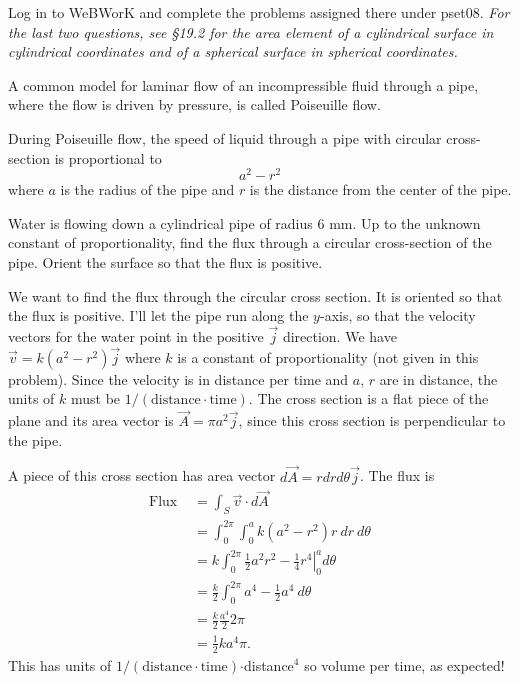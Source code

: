 \documentclass[12pt,letterpaper,noanswers]{exam}
\begin{document}
 \pdfpageheight 11in 
  \pdfpagewidth 8.5in

\begin{questions}
\question Log in to WeBWorK and complete the problems assigned there under pset08.  \emph{For the last two questions, see \S 19.2 for the area element of a cylindrical surface in cylindrical coordinates and of a spherical surface in spherical coordinates.}


\question A common model for laminar flow of an incompressible fluid through a pipe, where the flow is driven by pressure, is called Poiseuille flow.  



During Poiseuille flow, the speed of liquid through a pipe with circular cross-section is proportional to \[a^2-r^2\] where $a$ is the radius of the pipe and $r$ is the distance from the center of the pipe.  

\begin{parts}
\item Water is flowing down a cylindrical pipe of radius $6$ mm. Up to the unknown constant of proportionality, find the flux through a circular cross-section of the pipe.  Orient the surface so that the flux is positive.



\begin{solution}
We want to find the flux through the circular cross section.  It is oriented so that the flux is positive.  I'll let the pipe run along the $y$-axis, so that the velocity vectors for the water point in the positive $\vec j$ direction.  We have $\vec v = k(a^2-r^2)\vec j$ where $k$ is a constant of proportionality (not given in this problem).  Since the velocity is in distance per time and $a$, $r$ are in distance, the units of $k$ must be $1/(\text{distance}\cdot\text{time})$.  The cross section is a flat piece of the plane and its area vector is $\vec A = \pi a^2 \vec j$, since this cross section is perpendicular to the pipe.

A piece of this cross section has area vector $d\vec A = r drd\theta \vec j$.  The flux is
\begin{align*}
\text{Flux } &= \int_S \vec v \cdot d\vec A \\
&= \int_0^{2\pi}\int_0^a k(a^2-r^2) r\ dr\ d\theta \\
&= k\int_0^{2\pi} \left. \frac{1}{2}a^2r^2 - \frac{1}{4}r^4 \right\vert_0^a d\theta \\
&= \frac{k}{2} \int_0^{2\pi} a^4 - \frac{1}{2}a^4\ d\theta \\
&= \frac{k}{2}\frac{a^4}{2}2\pi \\
&= \frac{1}{2}ka^4\pi.
\end{align*}
This has units of  $1/(\text{distance}\cdot\text{time})$$\cdot$distance$^4$ so volume per time, as expected!


\end{solution}
\end{parts}
\end{questions}
\end{document}
